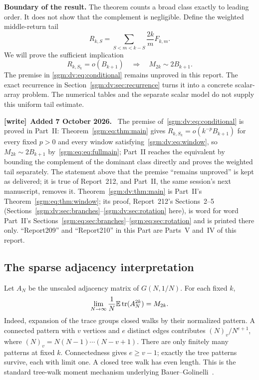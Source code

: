 \documentclass[11pt,letterpaper]{article}
\theoremstyle{remark}\newtheorem{remark}[theorem]{Remark}
\newenvironment{writenote}[1][]{\par\smallskip\begingroup\small
 \noindent\textbf{[write]}\if\relax\detokenize{#1}\relax\else~\textbf{#1.}\fi\ }%
 {\par\endgroup\smallskip}
\theoremstyle{definition}\newtheorem{definition}[theorem]{Definition}
\begin{document}
\textbf{Boundary of the result.} The theorem counts a broad class exactly to leading order. It does not show that the complement is negligible. Define the weighted middle-return tail
\begin{equation}\label{sgm:dv:eq:R}
 R_{k,S}=\sum_{S<m<k-S}\frac{2k}{m}F_{k,m}.
\end{equation}
We will prove the sufficient implication
\begin{equation}\label{sgm:dv:eq:conditional}
 R_{k,S_k}=o(B_{k+1})\quad\Longrightarrow\quad M_{2k}\sim2B_{k+1}.
\end{equation}
The premise in \eqref{sgm:dv:eq:conditional} remains unproved in this report. The exact recurrence in Section~\ref{sgm:dv:sec:recurrence} turns it into a concrete scalar-array problem. The numerical tables and the separate scalar model do not supply this uniform tail estimate.
\begin{writenote}[Added 7 October 2026]
The premise of~\eqref{sgm:dv:eq:conditional} is proved in Part~II: Theorem~\ref{sgm:eq:thm:main} gives $R_{k,S_k}=o(k^{-p}B_{k+1})$ for every fixed $p>0$ and every window satisfying~\eqref{sgm:dv:eq:window}, so $M_{2k}\sim2B_{k+1}$ by~\eqref{sgm:eq:eq:fullmain}; Part~II reaches the equivalent by bounding the complement of the dominant class directly and proves the weighted tail separately. The statement above that the premise ``remains unproved'' is kept as delivered; it is true of Report~212, and Part~II, the same session's next manuscript, removes it. Theorem~\ref{sgm:dv:thm:main} is Part~II's Theorem~\ref{sgm:eq:thm:window}; its proof, Report~212's Sections~2--5 (Sections~\ref{sgm:dv:sec:branches}--\ref{sgm:dv:sec:rotation} here), is word for word Part~II's Sections~\ref{sgm:eq:sec:branches}--\ref{sgm:eq:sec:rotation} and is printed there only. ``Report209'' and ``Report210'' in this Part are Parts~V and~IV of this report.
\end{writenote}

\subsection{The sparse adjacency interpretation}
Let $A_N$ be the unscaled adjacency matrix of $G(N,1/N)$. For each fixed $k$,
\begin{equation}\label{sgm:dv:eq:momentbridge}
 \lim_{N\to\infty}\frac1N\mathbb E\operatorname{tr}(A_N^{2k})=M_{2k}.
\end{equation}
Indeed, expansion of the trace groups closed walks by their normalized pattern. A connected pattern with $v$ vertices and $e$ distinct edges contributes
$(N)_v/N^{e+1}$, where $(N)_v=N(N-1)\cdots(N-v+1)$. There are only finitely many patterns at fixed $k$. Connectedness gives $e\ge v-1$; exactly the tree patterns survive, each with limit one. A closed tree walk has even length. This is the standard tree-walk moment mechanism underlying Bauer--Golinelli~\cite{bg}.
\end{document}
